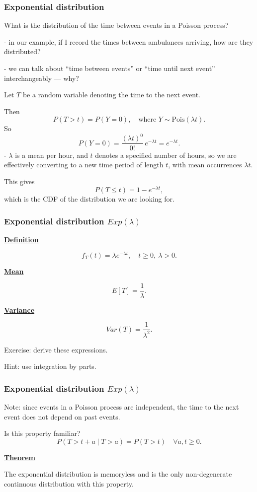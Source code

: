 \documentclass[t,8pt]{beamer}
\begin{document}
\begin{frame}
	\frametitle{Exponential distribution}
	
	What is the distribution of the time between events in a Poisson process? \par
	{\small\color{NavyBlue}
		- in our example, if I record the times between ambulances arriving, how are they distributed? \par
		- we can talk about ``time between events'' or ``time until next event'' interchangeably — why?
	}\par
	Let $T$ be a random variable denoting the time to the next event. \par
	Then
	\[
	P(T>t)=P(Y=0), \quad \text{where } Y\sim \text{Pois}(\lambda t).
	\]
	So
	\[
	P(Y=0)=\frac{(\lambda t)^0}{0!}\,e^{-\lambda t}=e^{-\lambda t}.
	\]
	{\small\color{NavyBlue}
		- $\lambda$ is a mean per hour, and $t$ denotes a specified number of hours, so we are effectively converting to a new time period of length $t$, with mean occurrences $\lambda t$.
	}\par
	This gives
	\[
	P(T\leq t)=1-e^{-\lambda t},
	\]
	which is the CDF of the distribution we are looking for.
\end{frame}

\begin{frame}
	\frametitle{Exponential distribution $Exp(\lambda)$}
	
	{\bf\underline{Definition}} \par
	\[
	f_T(t)=\lambda e^{-\lambda t},\quad t\ge 0,\ \lambda>0.
	\]
	
	{\bf\underline{Mean}} \par
	\[
	E[T]=\frac{1}{\lambda}.
	\]
	
	{\bf\underline{Variance}} \par
	\[
	Var(T)=\frac{1}{\lambda^2}.
	\]
	
	Exercise: derive these expressions. \par
	{\small\color{NavyBlue} Hint: use integration by parts.}
\end{frame}

\begin{frame}
	\frametitle{Exponential distribution $Exp(\lambda)$}
	
	Note: since events in a Poisson process are independent, the time to the next event does not depend on past events. \par
	Is this property familiar?
	\[
	P(T>t+a\mid T>a)=P(T>t)\quad\forall a,t\geq 0.
	\]
	
	{\bf\underline{Theorem}} \par
	The exponential distribution is memoryless and is the only non-degenerate continuous distribution with this property.
\end{frame}
\end{document}

